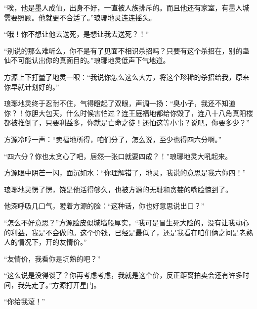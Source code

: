\begin{this_body}
“唉，他是墨人成仙，出身不好，一直被人族排斥的。而且他还有家室，有墨人城需要照顾。他就更不合适了。”琅琊地灵连连摇头。

“哦！你不想让他去送死，是想让我去送死？！”

“别说的那么难听么，你不是有了见面不相识杀招吗？只要有这个杀招在，别的蛊仙不可能认出你的真面目的。”琅琊地灵低声下气地道。

方源上下打量了地灵一眼：“我说你怎么这么大方，将这个珍稀的杀招给我，原来你早就计划好的。”

琅琊地灵终于忍耐不住，气得瞪起了双眼，声调一扬：“臭小子，我还不知道你？！你胆大包天，什么时候害怕过？连王庭福地都给你毁了，连八十八角真阳楼都被推倒了，只要利益多，你就是亡命之徒！还怕这等小事？说吧，你要多少？”

方源冷哼一声：“卖福地所得，咱们分了，怎么说，至少也得四六分啊。”

“四六分？你也太贪心了吧，居然一张口就要四成？！”琅琊地灵大吼起来。

方源眼中阴芒一闪，面沉如水：“你理解错了，地灵，我说的意思是我六你四！”

琅琊地灵愣了愣，饶是他活得够久，也被方源的无耻和贪婪的嘴脸惊到了。

他深呼吸几口气，瞪着方源的脸：“这种话，你也好意思说出口？”

“怎么不好意思？”方源脸皮似城墙般厚实，“我可是冒生死大险的，没有让我动心的利益，我是不会做的。这个价钱，已经是最低了，还是我看在咱们俩之间是老熟人的情况下，开的友情价。”

“友情价，我看你是坑熟的吧？”

“这么说是没得谈了？你再考虑考虑，我就是这个价，反正距离拍卖会还有许多时间，我先走了。”方源打开星门。

“你给我滚！”

\end{this_body}

